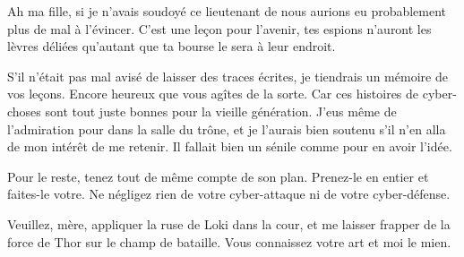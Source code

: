 \scene

\StageDirII{\reine, \princesse}

\begin{drama}
  \reinespeaks Ah ma fille, si je n’avais soudoyé ce lieutenant de \general{} nous aurions eu probablement plus de mal à l’évincer. C’est une leçon pour l’avenir, 
  tes espions n’auront les lèvres déliées qu’autant que ta bourse le sera à leur endroit.

  \princessespeaks S’il n’était pas mal avisé de laisser des traces écrites, je tiendrais un mémoire de vos leçons. Encore heureux que vous agîtes de la sorte. Car ces histoires de cyber-choses sont tout juste bonnes pour la vieille génération. J’eus même de l’admiration pour  \elena{} dans la salle du trône, et je l’aurais bien soutenu s’il n’en alla de mon intérêt de me retenir. Il fallait bien un sénile comme \general{} pour en avoir l’idée.

  \reinespeaks Pour le reste, tenez tout de même compte de son plan. Prenez-le en entier et faites-le votre. Ne négligez rien de votre cyber-attaque ni de votre cyber-défense.

  \princessespeaks Veuillez, mère, appliquer la ruse de Loki dans la cour, et me laisser frapper de la force de Thor sur le champ de bataille. Vous connaissez votre art et moi le mien.
\end{drama}

\scene

\StageDirII{\elena, \alexas}



